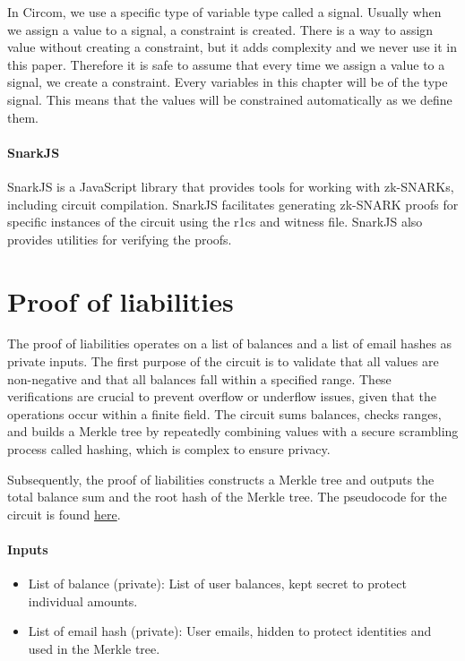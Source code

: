 In Circom, we use a specific type of variable type called a signal. Usually when we assign a value to a signal, a constraint is created.
There is a way to assign value without creating a constraint, but it adds complexity and we never use it in this paper. 
Therefore it is safe to assume that every time we assign a value to a signal, we create a constraint. 
Every variables in this chapter will be of the type signal.
This means that the values will be constrained automatically as we define them.


\paragraph{SnarkJS} 

SnarkJS is a JavaScript library that provides tools for working with zk-SNARKs, including circuit compilation.
SnarkJS facilitates generating zk-SNARK proofs for specific instances of the circuit using the r1cs and witness file.
SnarkJS also provides utilities for verifying the proofs.


\section{Proof of liabilities}
\label{subsec:pl}
The proof of liabilities operates on a list of balances and a list of email hashes as private inputs.
The first purpose of the circuit is to validate that all values are non-negative and that all balances fall within a specified range.
These verifications are crucial to prevent overflow or underflow issues, given that the operations occur within a finite field. 
The circuit sums balances, checks ranges, and builds a Merkle tree by repeatedly combining values with a secure scrambling process called hashing, which is complex to ensure privacy.

Subsequently, the proof of liabilities constructs a Merkle tree and outputs the total balance sum and the root hash of the Merkle tree.
The pseudocode for the circuit is found \hyperref[subsec:plc]{here}.


\paragraph{Inputs}
\begin{itemize}
   \item List of balance (private): List of user balances, kept secret to protect individual amounts.
   \item List of email hash (private): User emails, hidden to protect identities and used in the Merkle tree.
   \end{itemize}

